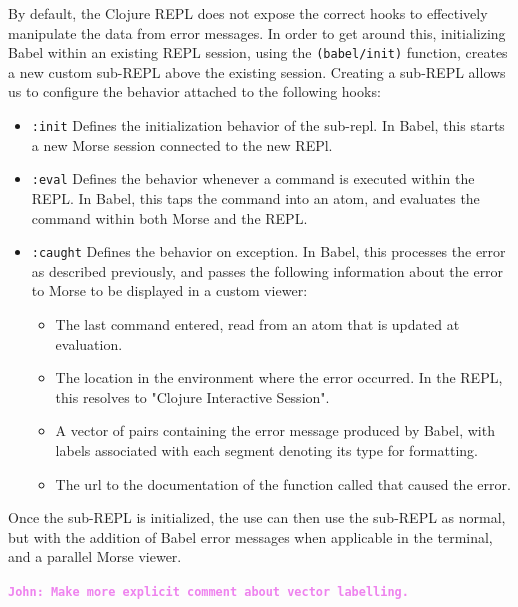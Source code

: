 \documentclass[12pt]{article}
\newcommand{\comment}[1]{{\bf \tt  {#1}}}
\newcommand{\jwcomment}[1]{\textcolor{violet}{\comment{John: {#1}}}}
\begin{document}
By default, the Clojure REPL does not expose the correct hooks to effectively manipulate the data from error messages.
In order to get around this, initializing Babel within an existing REPL session, using the \texttt{(babel/init)} function, creates a new custom sub-REPL above the existing session.
Creating a sub-REPL allows us to configure the behavior attached to the following hooks:
\begin{itemize}
	\item \texttt{:init} Defines the initialization behavior of the sub-repl. 
		In Babel, this starts a new Morse session connected to the new REPl.
	\item \texttt{:eval} Defines the behavior whenever a command is executed within the REPL. 
		In Babel, this taps the command into an atom, and evaluates the command within both Morse and the REPL.
	\item \texttt{:caught} Defines the behavior on exception.
		In Babel, this processes the error as described previously, 
			and passes the following information about the error to Morse to be displayed in a custom viewer:
			\begin{itemize}
				\item The last command entered, read from an atom that is updated at evaluation.
				\item The location in the environment where the error occurred. In the REPL, this resolves to "Clojure Interactive Session".
				\item A vector of pairs containing the error message produced by Babel, with labels associated with each segment denoting its type for formatting.
				\item The url to the documentation of the function called that caused the error. 
			\end{itemize}
\end{itemize}
Once the sub-REPL is initialized, the use can then use the sub-REPL as normal, but with the addition of Babel error messages when applicable in the terminal, and a parallel Morse viewer.

\jwcomment{Make more explicit comment about vector labelling.}

\end{document}
